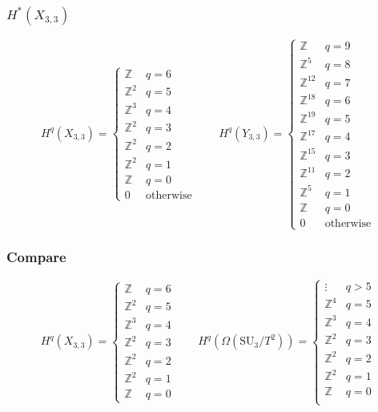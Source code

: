 \documentclass{beamer} %
\newcommand{\Z}{\mathbb{Z}}
\newcommand{\SU}{\mathrm{SU}}
\begin{document}
\begin{frame}
  \frametitle{$H^*(X_{3,3})$}
  \[ H^q(X_{3,3}) =
  \begin{cases}
    \Z & q=6 \\
    \Z^{2} & q=5 \\
    \Z^{3} & q=4 \\
    \Z^{2} & q=3 \\
    \Z^{2} & q=2 \\
    \Z^{2} & q=1 \\
    \Z & q = 0 \\
    0 & \text{otherwise}
  \end{cases}
  \qquad
  H^q(Y_{3,3}) =
  \begin{cases}
    \Z & q = 9\\
    \Z^{5} & q = 8\\
    \Z^{12} & q = 7\\
    \Z^{18} & q = 6\\
    \Z^{19} & q = 5\\
    \Z^{17} & q = 4\\
    \Z^{15} & q = 3\\
    \Z^{11} & q = 2\\
    \Z^{5} & q = 1\\
    \Z & q = 0 \\
    0 & \text{otherwise}
  \end{cases} \]
\end{frame}

\begin{frame}
  \frametitle{Compare}
  \[ H^q(X_{3,3}) =
  \begin{cases}
    \Z & q=6 \\
    \Z^{2} & q=5 \\
    \Z^{3} & q=4 \\
    \Z^{2} & q=3 \\
    \Z^{2} & q=2 \\
    \Z^{2} & q=1 \\
    \Z & q = 0
  \end{cases}
  \qquad
  H^q(\Omega(\SU_3/T^2)) =
  \begin{cases}
    \vdots & q > 5 \\
    \Z^4 & q = 5 \\
    \Z^3 & q = 4 \\
    \Z^2 & q = 3 \\
    \Z^2 & q = 2 \\
    \Z^2 & q = 1 \\
    \Z & q = 0 \\
  \end{cases} \]
\end{frame}
\end{document}
